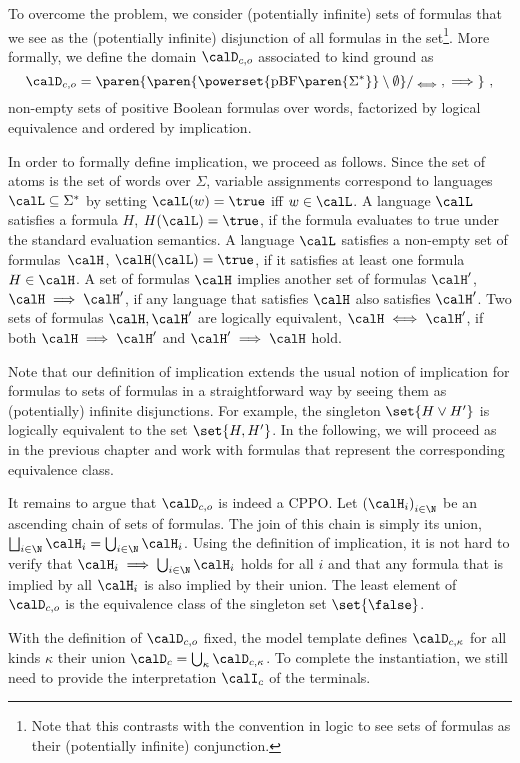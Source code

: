 \documentclass[../../diss.tex]{subfiles}
\begin{document}
To overcome the problem, we consider (potentially infinite) sets of formulas that we see as the (potentially infinite) disjunction of all formulas in the set\footnote{Note that this contrasts with the convention in logic to see sets of formulas as their (potentially infinite) conjunction.}.
More formally, we define the domain $\domainc{\ground}$ associated to kind ground as
\[
    \domainc{\ground} =
    \paren{ \paren{\powerset{\pBF\paren{\Sigma^*}} \setminus \emptyset}/_{\lequiv},\lleq }
    \ ,
\]
non-empty sets of positive Boolean formulas over words, factorized by logical equivalence and ordered by implication.

In order to formally define implication, we proceed as follows.
Since the set of atoms is the set of words over $\Sigma$, variable assignments correspond to languages $\calL \subseteq \Sigma^*$ by setting $\calL(w) = \true$ iff $w \in \calL$.
A language $\calL$ satisfies a formula $H$, $H(\calL) = \true$, if the formula evaluates to true under the standard evaluation semantics.
A language $\calL$ satisfies a non-empty set of formulas~$\sof$, $\sof(\calL) = \true$, if it satisfies at least one formula $H \in \sof$.
A set of formulas $\sof$ implies another set of formulas $\sof'$, $\sof \lleq \sof'$, if any language that satisfies $\sof$ also satisfies $\sof'$.
Two sets of formulas $\sof, \sof'$ are logically equivalent, $\sof \lequiv \sof'$, if both $\sof \lleq \sof'$ and $\sof' \lleq \sof$ hold.

Note that our definition of implication extends the usual notion of implication for formulas to sets of formulas in a straightforward way by seeing them as (potentially) infinite disjunctions.
For example, the singleton $\set{H \vee H'}$ is logically equivalent to the set $\set{H, H'}$.
In the following, we will proceed as in the previous chapter and work with formulas that represent the corresponding equivalence class.

It remains to argue that $\domainc{\ground}$ is indeed a CPPO.\@
Let ${(\sof_i)}_{i \in \N}$ be an ascending chain of sets of formulas.
The join of this chain is simply its union, $\bigsqcup_{i \in \N} \sof_i = \bigcup_{i \in \N} \sof_i$.
Using the definition of implication, it is not hard to verify that $\sof_i \lleq \bigcup_{i \in \N} \sof_i$ holds for all $i$ and that any formula that is implied by all $\sof_i$ is also implied by their union.
The least element of $\domainc{\ground}$ is the equivalence class of the singleton set $\set{\false}$.

With the definition of $\domainc{\ground}$ fixed, the model template defines $\domainc{\kappa}$ for all kinds $\kappa$ their union $\domainc = \bigcup_{\kappa} \domainc{\kappa}$.
To complete the instantiation, we still need to provide the interpretation $\interpretationc$ of the terminals.
\end{document}

